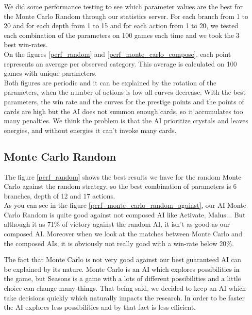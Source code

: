        We did some performance testing to see which parameter values are the best for the Monte Carlo Random through our statistics server. For each branch from 1 to 20 and for each depth from 1 to 15 and for each action from 1 to 20, we tested each combination of the parameters on 100 games each time and we took the 3 best win-rates.\\
        On the figures \ref{perf_random} and \ref{perf_monte_carlo_compose}, each point represents an average per observed category. This average is calculated on 100 games with unique parameters.\\
        Both figures are periodic and it can be explained by the rotation of the parameters, when the number of actions is low all curves decrease. With the best parameters, the win rate and the curves for the prestige points and the points of cards are high but the AI does not summon enough cards, so it accumulates too many penalties. We think the problem is that the AI prioritize crystals and leaves energies, and without energies it can't invoke many cards. 
        
        \subsection{Monte Carlo Random}
        
        The figure \ref{perf_random} shows the best results we have for the random Monte Carlo against the random strategy, so the best combination of parameters is 6 branches, depth of 12 and 17 actions.\\
        
        As you can see in the figure \ref{perf_monte_carlo_random_against}, our AI Monte Carlo Random is quite good against not composed AI like Activate, Malus... But although it as 71\% of victory against the random AI, it isn't as good as our composed AI.
        Moreover when we look at the matches between Monte Carlo and the composed AIs, it is obviously not really good with a win-rate below 20\%.
        
        The fact that Monte Carlo is not very good against our best guaranteed AI can be explained by its nature. Monte Carlo is an AI which explores possibilities in the game, but Seasons is a game with a lots of different possibilities and a little choice can change many things. That being said, we decided to keep an AI which take decisions quickly which naturally impacts the research. In order to be faster the AI explores less possibilities and by that fact is less efficient. 
        
